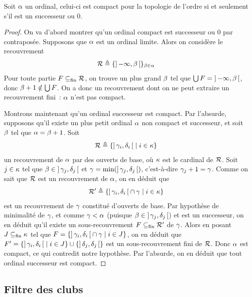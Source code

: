 \begin{proposition}\label{prop.compac.succ}
  Soit $\alpha$ un ordinal, celui-ci est compact pour la topologie de l'ordre si
  et seulement s'il est un successeur ou $0$.
\end{proposition}

\begin{proof}
  On va d'abord montrer qu'un ordinal compact est successeur ou $0$ par
  contraposée. Supposons que $\alpha$ est un ordinal limite. Alors on considère
  le recouvrement
  \[\mathcal R \triangleq \{\mathord{\left]\,\mathord{-}\infty,\beta\,\right[}\}_{\beta \in \alpha}\]
  Pour toute partie $F\subseteq_{\mathrm{fin}}\mathcal R$, on trouve un plus grand $\beta$ tel
  que $\bigcup F = \mathord{\left]\,\mathord{-}\infty,\beta\,\right[}$, donc $\beta + 1 \notin\bigcup F$.
  On a donc un recouvrement dont on ne peut extraire un recouvrement fini~:
  $\alpha$ n'est pas compact.

  Montrons maintenant qu'un ordinal successeur est compact. Par l'absurde,
  supposons qu'il existe un plus petit ordinal $\alpha$ non compact et
  successeur, et soit $\beta$ tel que $\alpha = \beta + 1$. Soit
  \[\mathcal R \triangleq \left\{ \mathord{\left]\,\gamma_i,\delta_i\,\right[} \;\middle\vert\; i \in \kappa \right\}\]
  un recouvrement de $\alpha$ par des ouverts de base, où $\kappa$ est le
  cardinal de $\mathcal R$. Soit $j \in \kappa$ tel que
  $\beta \in \mathord{\left]\,\gamma_j,\delta_j\,\right[}$ et
  $\gamma = \min(\mathord{\left]\,\gamma_j,\delta_j\,\right[})$,
  c'est-à-dire $\gamma_j + 1 = \gamma$. Comme on sait que $\mathcal R$ est un
  recouvrement de $\alpha$, on en déduit que
  \[\mathcal R' \triangleq
  \left\{ \mathord{\left]\,\gamma_i,\delta_i\,\right[} \cap \gamma \;\middle\vert\; i \in \kappa \right\}\]
  est un recouvrement de $\gamma$ constitué d'ouverts de base. Par hypothèse de
  minimalité de $\gamma$, et comme $\gamma < \alpha$
  (puisque $\beta \in \mathord{\left]\,\gamma_j,\delta_j\,\right[}$) et est un successeur, on en
  déduit qu'il existe un sous-recouvrement $F\subseteq_{\mathrm{fin}} \mathcal R'$ de $\gamma$.
  Alors en posant $J\subseteq_{\mathrm{fin}} \kappa$ tel que
  $F = \left\{ \mathord{\left]\,\gamma_i,\delta_i\,\right[}\cap \gamma \;\middle\vert\; i \in J \right\}$, on en déduit que
  $F' = \left\{ \mathord{\left]\,\gamma_i,\delta_i\,\right[} \;\middle\vert\; i \in J \right\} \cup
  \{\mathord{\left]\,\delta_j,\delta_j\,\right[}\}$ est
  un sous-recouvrement fini de $\mathcal R$. Donc $\alpha$ est compact, ce qui
  contredit notre hypothèse. Par l'absurde, on en déduit que tout ordinal
  successeur est compact.
\end{proof}

\subsection{Filtre des clubs}

